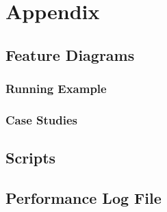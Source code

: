 \appendix
\chapter{Appendix}
\label{appendix}

\section{Feature Diagrams}
\label{feature_diagrams}

\subsection{Running Example}



\subsection{Case Studies}


\section{Scripts}




\section{Performance Log File}
